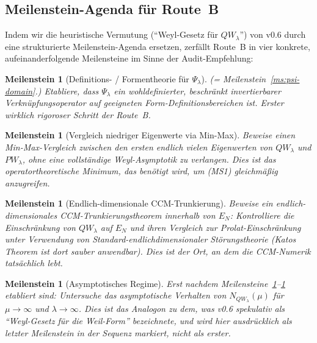 \documentclass[11pt,a4paper]{article}
\theoremstyle{plain}
\newtheorem{milestone}[theorem]{Meilenstein}
\theoremstyle{definition}
\begin{document}
\subsection{Meilenstein-Agenda für Route~B}
\label{sec:route-b-milestones}

Indem wir die heuristische Vermutung (``Weyl-Gesetz für $QW_\lambda$'') von
v0.6 durch eine strukturierte Meilenstein-Agenda ersetzen, zerfällt Route~B
in vier konkrete, aufeinanderfolgende Meilensteine im Sinne der Audit-Empfehlung:

\begin{milestone}[Definitions- / Formentheorie für $\Psi_\lambda$]
\label{ms:1}
(= Meilenstein~\ref{ms:psi-domain}.) Etabliere, dass $\Psi_\lambda$ ein
wohldefinierter, beschränkt invertierbarer Verknüpfungsoperator auf geeigneten
Form-Definitionsbereichen ist. Erster wirklich rigoroser Schritt der Route~B.
\end{milestone}

\begin{milestone}[Vergleich niedriger Eigenwerte via Min-Max]
\label{ms:2}
Beweise einen Min-Max-Vergleich zwischen den ersten endlich vielen
Eigenwerten von $QW_\lambda$ und $PW_\lambda$, \emph{ohne}
eine vollständige Weyl-Asymptotik zu verlangen. Dies ist das operatortheoretische
Minimum, das benötigt wird, um (MS1) gleichmäßig anzugreifen.
\end{milestone}

\begin{milestone}[Endlich-dimensionale CCM-Trunkierung]
\label{ms:3}
Beweise ein endlich-dimensionales CCM-Trunkierungstheorem innerhalb von $E_N$:
Kontrolliere die Einschränkung von $QW_\lambda$ auf $E_N$ und ihren Vergleich
zur Prolat-Einschränkung unter Verwendung von Standard-endlichdimensionaler
Störungstheorie (Katos Theorem ist dort sauber anwendbar). Dies ist der Ort, an dem
die CCM-Numerik tatsächlich lebt.
\end{milestone}

\begin{milestone}[Asymptotisches Regime]
\label{ms:4}
Erst nachdem Meilensteine~\ref{ms:1}--\ref{ms:3} etabliert sind:
Untersuche das asymptotische Verhalten von $N_{QW_\lambda}(\mu)$ für
$\mu \to \infty$ und $\lambda \to \infty$. Dies ist das Analogon zu
dem, was v0.6 spekulativ als ``Weyl-Gesetz für die Weil-Form'' bezeichnete,
und wird hier ausdrücklich als \emph{letzter} Meilenstein in der Sequenz
markiert, nicht als erster.
\end{milestone}
\end{document}
